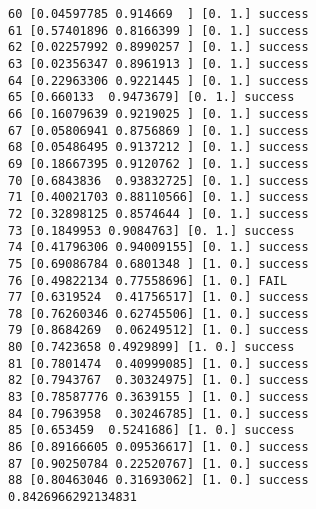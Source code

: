 \documentclass[11pt]{article}
\begin{document}
\begin{Verbatim}[commandchars=\\\{\}]
60 [0.04597785 0.914669  ] [0. 1.] success
61 [0.57401896 0.8166399 ] [0. 1.] success
62 [0.02257992 0.8990257 ] [0. 1.] success
63 [0.02356347 0.8961913 ] [0. 1.] success
64 [0.22963306 0.9221445 ] [0. 1.] success
65 [0.660133  0.9473679] [0. 1.] success
66 [0.16079639 0.9219025 ] [0. 1.] success
67 [0.05806941 0.8756869 ] [0. 1.] success
68 [0.05486495 0.9137212 ] [0. 1.] success
69 [0.18667395 0.9120762 ] [0. 1.] success
70 [0.6843836  0.93832725] [0. 1.] success
71 [0.40021703 0.88110566] [0. 1.] success
72 [0.32898125 0.8574644 ] [0. 1.] success
73 [0.1849953 0.9084763] [0. 1.] success
74 [0.41796306 0.94009155] [0. 1.] success
75 [0.69086784 0.6801348 ] [1. 0.] success
76 [0.49822134 0.77558696] [1. 0.] FAIL
77 [0.6319524  0.41756517] [1. 0.] success
78 [0.76260346 0.62745506] [1. 0.] success
79 [0.8684269  0.06249512] [1. 0.] success
80 [0.7423658 0.4929899] [1. 0.] success
81 [0.7801474  0.40999085] [1. 0.] success
82 [0.7943767  0.30324975] [1. 0.] success
83 [0.78587776 0.3639155 ] [1. 0.] success
84 [0.7963958  0.30246785] [1. 0.] success
85 [0.653459  0.5241686] [1. 0.] success
86 [0.89166605 0.09536617] [1. 0.] success
87 [0.90250784 0.22520767] [1. 0.] success
88 [0.80463046 0.31693062] [1. 0.] success
0.8426966292134831

    \end{Verbatim}


    
    
    
    
\end{document}
